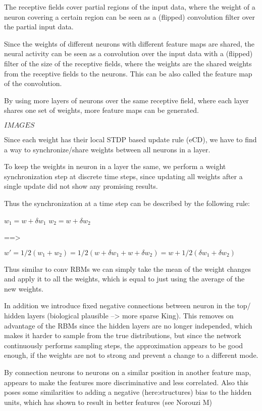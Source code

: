 The receptive fields cover partial regions of the input data, where the weight of a neuron covering a certain region can be seen as a (flipped) convolution filter over the partial input data.

Since the weights of different neurons with different feature maps are shared, the neural activity can be seen as a convolution over the input data with a (flipped) filter of the size of the receptive fields, where the weights are the shared weights from the receptive fields to the neurons.
This can be also called the feature map of the convolution.

By using more layers of neurons over the same receptive field, where each layer shares one set of weights, more feature maps can be generated.

$IMAGES$

Since each weight has their local STDP based update rule (eCD), we have to find a way to synchronize/share weights between all neurons in a layer.

To keep the weights in neuron in a layer the same, we perform a weight synchronization step at discrete time steps, since updating all weights after a single update did not show any promising results.

Thus the synchronization at a time step can be described by the following rule:  

$w_1 = w + \delta w_1 $
$w_2 = w + \delta w_2 $

==> 

$w' = 1/2 (w_1 + w_2 ) = 1/2 (w + \delta w_1 + w + \delta w_2) = w + 1/2 (\delta w_1 + \delta w_2)$

Thus similar to conv RBMs we can simply take the mean of the weight changes and apply it to all the weights, which is equal to just using the average of the new weights. 

In addition we introduce fixed negative connections between neuron in the top/ hidden layers (biological plausible --> more sparse King).
This removes on advantage of the RBMs since the hidden layers are no longer independed, which makes it harder to sample from the true distributions, but since the network continuously performs sampling steps, the approximation appears to be good enough, if the weights are not to strong and prevent a change to a different mode.

By connection neurons to neurons on a similar position in another feature map, appears to make the features more discriminative and less correlated.
Also this poses some similarities to adding a negative (here:structures) bias to the hidden units, which has shown to result in better features (see Norouzi M)

